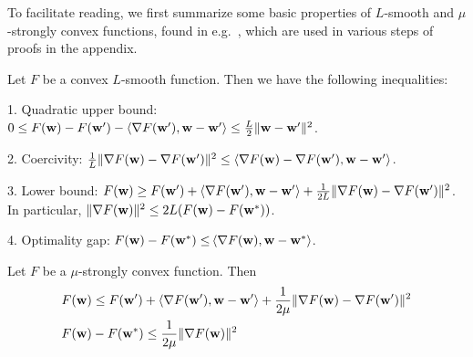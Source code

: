 

To facilitate reading, we first summarize some basic properties of $L$-smooth and $\mu$-strongly
convex functions, found in e.g.~\cite{rockafellar1970convex}, which are used in various steps of proofs in the appendix. 
\begin{lemma}
	Let $F$ be a convex $L$-smooth function. Then we have the following
	inequalities:
	
	1. Quadratic upper bound: $0\leq F({\mathbf{w}})-F({\mathbf{w}}')-\langle\nabla F({\mathbf{w}}'),{\mathbf{w}}-{\mathbf{w}}'\rangle\leq\frac{L}{2}\|{\mathbf{w}}-{\mathbf{w}}'\|^{2}$. 
	
	2. Coercivity: $\frac{1}{L}\|\nabla F({\mathbf{w}})-\nabla F({\mathbf{w}}')\|^{2}\leq\langle\nabla F({\mathbf{w}})-\nabla F({\mathbf{w}}'),{\mathbf{w}}-{\mathbf{w}}'\rangle$.
	
	3. Lower bound: $F({\mathbf{w}})\geq F({\mathbf{w}}')+\langle\nabla F({\mathbf{w}}'),{\mathbf{w}}-{\mathbf{w}}'\rangle+\frac{1}{2L}\|\nabla F({\mathbf{w}})-\nabla F({\mathbf{w}}')\|^{2}$.
	In particular, $\|\nabla F({\mathbf{w}})\|^{2}\leq2L(F({\mathbf{w}})-F({\mathbf{w}}^{\ast}))$.
	
	4. Optimality gap: $F({\mathbf{w}})-F({\mathbf{w}}^{\ast})\leq$$\langle\nabla F({\mathbf{w}}),{\mathbf{w}}-{\mathbf{w}}^{\ast}\rangle$.
\label{lem:lsmooth}
\end{lemma}
%
\begin{lemma}
	Let $F$ be a $\mu$-strongly convex function. Then 
	\begin{align*}
	& F({\mathbf{w}})  \leq F({\mathbf{w}}')+\langle\nabla F({\mathbf{w}}'),{\mathbf{w}}-{\mathbf{w}}'\rangle+\frac{1}{2\mu}\|\nabla F({\mathbf{w}})-\nabla F({\mathbf{w}}')\|^{2}\\
	& F({\mathbf{w}})-F({\mathbf{w}}^{\ast})  \leq\frac{1}{2\mu}\|\nabla F({\mathbf{w}})\|^{2}
	\end{align*}
\end{lemma}
